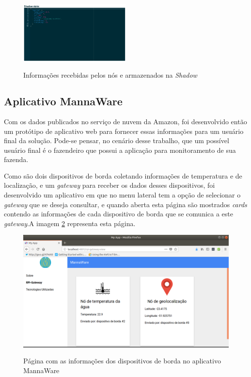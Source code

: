 \documentclass[
    hidelinks,
	12pt,				%
	openany,
	oneside, 
	a4paper,			%
	english,			%
	french,				%
	spanish,			%
	brazil				%
	]{abntex2}
\begin{document}
\begin{figure}[ht]
    \centering    
    \caption{Informações recebidas pelos nós e armazenados na \textit{Shadow}}
    \includegraphics[width=0.5\textwidth]{shadow.png}
    \label{fig:shadow}
\end{figure}

\subsection{Aplicativo MannaWare}

Com os dados publicados no serviço de nuvem da Amazon, foi desenvolvido então um protótipo de aplicativo web para fornecer essas informações para um usuário final da solução. Pode-se pensar, no cenário desse trabalho, que um possível usuário final é o fazendeiro que possui a aplicação para monitoramento de sua fazenda.

Como são dois dispositivos de borda coletando informações de temperatura e de localização, e um \textit{gateway} para receber os dados desses dispositivos, foi desenvolvido um aplicativo em que no menu lateral tem a opção de selecionar o \textit{gateway} que se deseja consultar, e quando aberta esta página são mostrados \textit{cards} contendo as informações de cada dispositivo de borda que se comunica a este \textit{gateway}.A imagem \ref{fig:screenshotmannaware} representa esta página.

\begin{figure}[ht]
    \centering
    \caption{Página com as informações dos dispositivos de borda no aplicativo MannaWare}
    \includegraphics[width=1\textwidth]{screenshot-mannaware.png}
    \label{fig:screenshotmannaware}
\end{figure}
\end{document}
